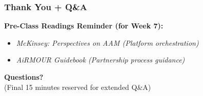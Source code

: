 \documentclass{beamer}
\begin{document}
\begin{frame}[t]
  \frametitle{Thank You + Q\&A}
  
  \textbf{Pre-Class Readings Reminder (for Week 7):}
  \begin{itemize}
      \item \textit{McKinsey: Perspectives on AAM (Platform orchestration)}
      \item \textit{AiRMOUR Guidebook (Partnership process guidance)}
  \end{itemize}
  
  \vspace{1cm}
  \begin{center}
      \textbf{Questions?} \\
      \small (Final 15 minutes reserved for extended Q\&A)
  \end{center}
\end{frame}
\end{document}
